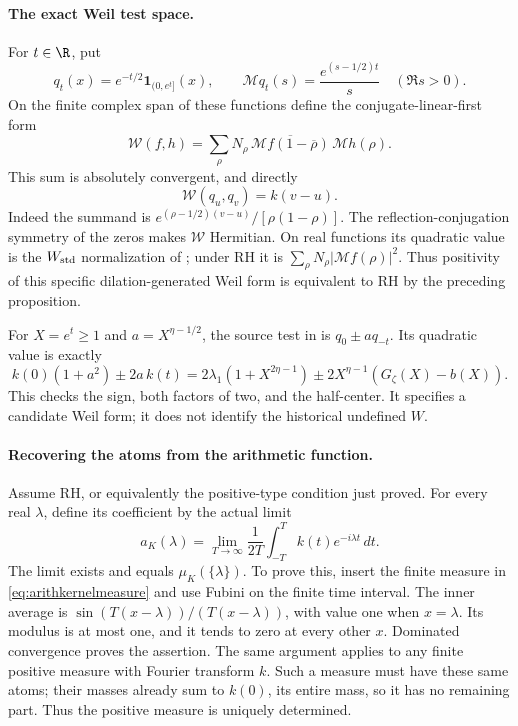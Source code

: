 \paragraph{The exact Weil test space.}
For \(t\in\R\), put
\[
 q_t(x)=e^{-t/2}\mathbf1_{(0,e^t]}(x),\qquad
 \mathcal Mq_t(s)=\frac{e^{(s-1/2)t}}s\quad(\Re s>0).
\]
On the finite complex span of these functions define the
conjugate-linear-first form
\[
 \mathcal W(f,h)=
 \sum_\rho N_\rho\,
 \overline{\mathcal Mf(1-\overline\rho)}\,\mathcal Mh(\rho).
\]
This sum is absolutely convergent, and directly
\begin{equation}\label{eq:arithkernelweilgram}
 \mathcal W(q_u,q_v)=k(v-u).
\end{equation}
Indeed the summand is
\(e^{(\rho-1/2)(v-u)}/[\rho(1-\rho)]\).
The reflection-conjugation symmetry of the zeros makes
\(\mathcal W\) Hermitian. On real functions its quadratic value is
the \(W_{\rm std}\) normalization of ; under RH it is
\(\sum_\rho N_\rho|\mathcal Mf(\rho)|^2\).
Thus positivity of this specific dilation-generated Weil form is
equivalent to RH by the preceding proposition.

For \(X=e^t\ge1\) and \(a=X^{\eta-1/2}\), the source test in
 is \(q_0\pm a q_{-t}\). Its quadratic value is exactly
\[
 k(0)(1+a^2)\pm2a\,k(t)
 =2\lambda_1(1+X^{2\eta-1})
 \pm2X^{\eta-1}(G_\zeta(X)-b(X)).
\]
This checks the sign, both factors of two, and the half-center.
It specifies a candidate Weil form; it does not identify the
historical undefined \(W\).

\paragraph{Recovering the atoms from the arithmetic function.}
Assume RH, or equivalently the positive-type condition just proved.
For every real \(\lambda\), define its coefficient by the actual limit
\begin{equation}\label{eq:arithkernelatom}
 a_K(\lambda)=
 \lim_{T\to\infty}\frac1{2T}
       \int_{-T}^{T}k(t)e^{-i\lambda t}\,dt.
\end{equation}
The limit exists and equals \(\mu_K(\{\lambda\})\). To prove this,
insert the finite measure in \eqref{eq:arithkernelmeasure} and use
Fubini on the finite time interval. The inner average is
\(\sin(T(x-\lambda))/(T(x-\lambda))\), with value one when
\(x=\lambda\). Its modulus is at most one, and it tends to zero
at every other \(x\). Dominated convergence proves the assertion.
The same argument applies to any finite positive measure with Fourier
transform \(k\). Such a measure must have these same atoms; their
masses already sum to \(k(0)\), its entire mass, so it has no
remaining part. Thus the positive measure is uniquely determined.

